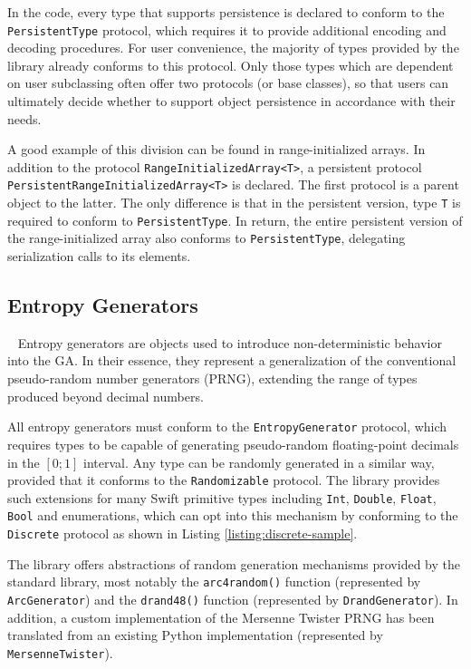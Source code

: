 In the code, every type that supports persistence is declared to conform to the \texttt{PersistentType} protocol, which requires it to provide additional encoding and decoding procedures. For user convenience, the majority of types provided by the library already conforms to this protocol. Only those types which are dependent on user subclassing often offer two protocols (or base classes), so that users can ultimately decide whether to support object persistence in accordance with their needs.

A good example of this division can be found in range-initialized arrays. In addition to the protocol \texttt{RangeInitializedArray<T>}, a persistent protocol \texttt{PersistentRangeInitializedArray<T>} is declared. The first protocol is a parent object to the latter. The only difference is that in the persistent version, type \texttt{T} is required to conform to \texttt{PersistentType}. In return, the entire persistent version of the range-initialized array also conforms to \texttt{PersistentType}, delegating serialization calls to its elements.

\subsection{Entropy Generators}~\label{section:entropy-generators}
Entropy generators are objects used to introduce non-deterministic behavior into the GA. In their essence, they represent a generalization of the conventional pseudo-random number generators (PRNG), extending the range of types produced beyond decimal numbers.

All entropy generators must conform to the \texttt{EntropyGenerator} protocol, which requires types to be capable of generating pseudo-random floating-point decimals in the $[0;1]$ interval. Any type can be randomly generated in a similar way, provided that it conforms to the \texttt{Randomizable} protocol. The library provides such extensions for many Swift primitive types including \texttt{Int}, \texttt{Double}, \texttt{Float}, \texttt{Bool} and enumerations, which can opt into this mechanism by conforming to the \texttt{Discrete} protocol as shown in Listing \ref{listing:discrete-sample}.

The library offers abstractions of random generation mechanisms provided by the standard library, most notably the \texttt{arc4random()} function (represented by \texttt{ArcGenerator}) and the \texttt{drand48()} function (represented by \texttt{DrandGenerator}). In addition, a custom implementation of the Mersenne Twister PRNG has been translated from an existing Python implementation (represented by \texttt{MersenneTwister}).
